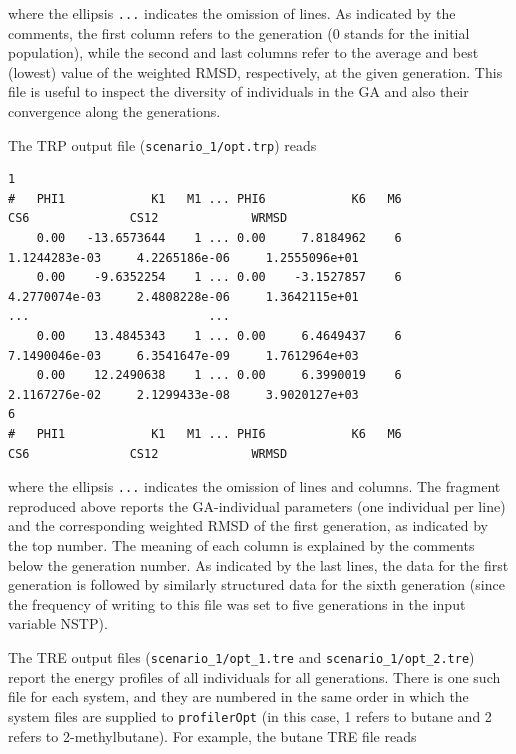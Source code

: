 \documentclass[10pt,a4paper]{report}
\numberwithin{equation}{section}
\newcommand{\under}{\_}
\newcommand{\profileropt}[0]{\texttt{profilerOpt}}
\begin{document}
\noindent where the ellipsis \texttt{...} indicates the omission of
lines.
%
As indicated by the comments, the first column refers to the
generation (0 stands for the initial population), while the second and
last columns refer to the average and best (lowest) value of the
weighted RMSD, respectively, at the given generation.
%
This file is useful to inspect the diversity of individuals in the GA
and also their convergence along the generations.

The TRP output file (\texttt{scenario\under{}1/opt.trp}) reads

\begin{lstlisting}
1    
#   PHI1            K1   M1 ... PHI6            K6   M6               CS6              CS12             WRMSD
    0.00   -13.6573644    1 ... 0.00     7.8184962    6     1.1244283e-03     4.2265186e-06     1.2555096e+01
    0.00    -9.6352254    1 ... 0.00    -3.1527857    6     4.2770074e-03     2.4808228e-06     1.3642115e+01
...                         ...
    0.00    13.4845343    1 ... 0.00     6.4649437    6     7.1490046e-03     6.3541647e-09     1.7612964e+03
    0.00    12.2490638    1 ... 0.00     6.3990019    6     2.1167276e-02     2.1299433e-08     3.9020127e+03
6    
#   PHI1            K1   M1 ... PHI6            K6   M6               CS6              CS12             WRMSD
\end{lstlisting}\vspace{-2ex}\par

\noindent where the ellipsis \texttt{...} indicates the omission of
lines and columns.
%
The fragment reproduced above reports the GA-individual parameters
(one individual per line) and the corresponding weighted RMSD of the
first generation, as indicated by the top number.
%
The meaning of each column is explained by the comments below the
generation number.
%
As indicated by the last lines, the data for the first generation is
followed by similarly structured data for the sixth generation (since
the frequency of writing to this file was set to five generations in
the input variable NSTP).
%

The TRE output files (\texttt{scenario\under{}1/opt\under{}1.tre} and
\texttt{scenario\under{}1/opt\under{}2.tre}) report the energy
profiles of all individuals for all generations.
%
There is one such file for each system, and they are numbered in the
same order in which the system files are supplied to \profileropt{}
(in this case, 1 refers to butane and 2 refers to 2-methylbutane).
%
For example, the butane TRE file reads
\end{document}
